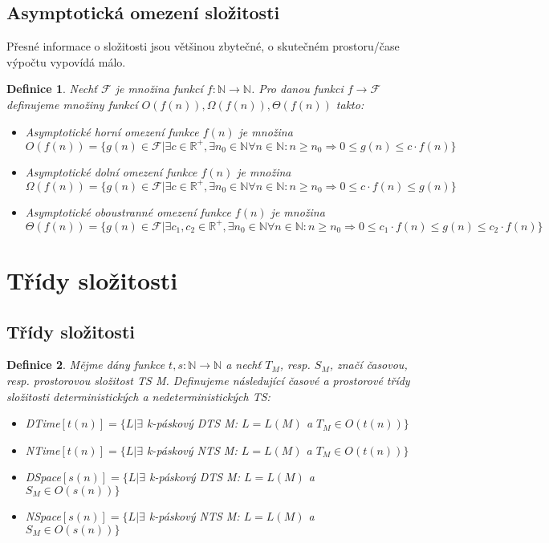 \documentclass[a4paper, 11pt]{report}
\newtheorem{mydef}{Definice}[chapter]
\begin{document}
\subsection{Asymptotická omezení složitosti}
Přesné informace o složitosti jsou většinou zbytečné, o skutečném prostoru/čase výpočtu vypovídá málo.

\begin{mydef}
Nechť $\mathcal{F}$ je množina funkcí $f: \mathbb{N} \to \mathbb{N}$. Pro danou funkci $f \to \mathcal{F}$ definujeme množiny funkcí $O(f(n)), \Omega(f(n)), \Theta(f(n))$ takto:
\begin{itemize}
	\item Asymptotické horní omezení funkce $f(n)$ je množina $O(f(n)) = \{g(n) \in \mathcal{F} | \exists c \in \mathbb{R}^+, \exists n_0 \in \mathbb{N} \forall n \in \mathbb{N}: n \geq n_0 \Rightarrow 0 \leq g(n) \leq c \cdot f(n)\}$
	\item Asymptotické dolní omezení funkce $f(n)$ je množina $\Omega(f(n)) = \{g(n) \in \mathcal{F} | \exists c \in \mathbb{R}^+, \exists n_0 \in \mathbb{N} \forall n \in \mathbb{N}: n \geq n_0 \Rightarrow 0 \leq c \cdot f(n) \leq g(n)\}$
	\item Asymptotické oboustranné omezení funkce $f(n)$ je množina $\Theta(f(n)) = \{g(n) \in \mathcal{F} | \exists c_1, c_2 \in \mathbb{R}^+, \exists n_0 \in \mathbb{N} \forall n \in \mathbb{N}: n \geq n_0 \Rightarrow 0 \leq c_1 \cdot f(n) \leq g(n) \leq c_2 \cdot f(n)\}$
\end{itemize}
\end{mydef}

\section{Třídy složitosti}
\subsection{Třídy složitosti}

\begin{mydef}
Mějme dány funkce $t, s : \mathbb{N} \to \mathbb{N}$ a nechť $T_M$, resp. $S_M$, značí časovou, resp. prostorovou složitost TS M. Definujeme následující časové a prostorové třídy složitosti deterministických a nedeterministických TS:
\begin{itemize}
	\item DTime$[t(n)] = \{L | \exists $ k-páskový DTS M: $L = L(M)$ a $T_M \in O(t(n))\}$
	\item NTime$[t(n)] = \{L | \exists $ k-páskový NTS M: $L = L(M)$ a $T_M \in O(t(n))\}$
	\item DSpace$[s(n)] = \{L | \exists $ k-páskový DTS M: $L = L(M)$ a $S_M \in O(s(n))\}$
	\item NSpace$[s(n)] = \{L | \exists $ k-páskový NTS M: $L = L(M)$ a $S_M \in O(s(n))\}$
\end{itemize}
\end{mydef}
\end{document}
